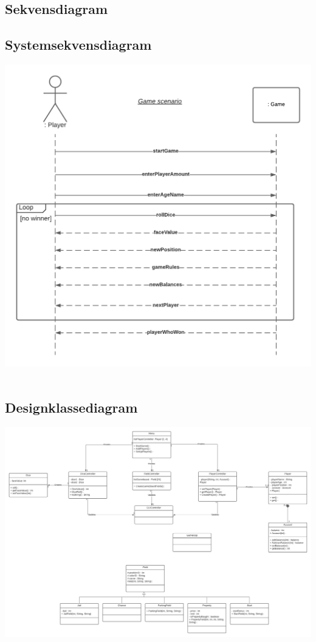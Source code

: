 \subsection{Sekvensdiagram}
\subsection{Systemsekvensdiagram}

\includegraphics[width=1\textwidth]{Report/figures/System sekvensdiagram.png}~\\[1cm]

\subsection{Designklassediagram}

\includegraphics[width=1\textwidth]{Report/figures/Class Diagram.png}~\\[1cm]
